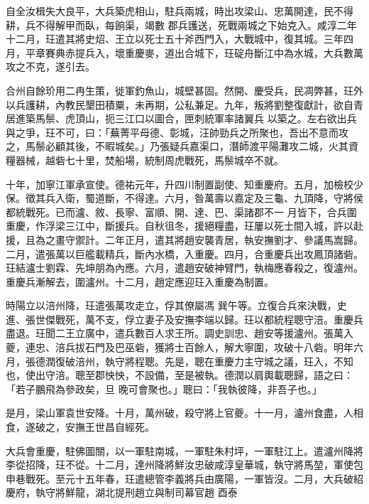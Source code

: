 \begin{pinyinscope}
 自全汝楫失大良平，大兵築虎相山，駐兵兩城，時出攻梁山、忠萬開達，民不得耕，兵不得解甲而臥，每餉渠，竭數
 郡兵護送，死戰兩城之下始克入。咸淳二年十二月，玨遣其將史炤、王立以死士五十斧西門入，大戰城中，復其城。三年四月，平章賽典赤提兵入，壞重慶麥，道出合城下，玨碇舟斷江中為水城，大兵數萬攻之不克，遂引去。



 合州自餘玠用二冉生策，徙軍釣魚山，城壁甚固。然開、慶受兵，民凋弊甚，玨外以兵護耕，內教民墾田積粟，未再期，公私兼足。九年，叛將劉整復獻計，欲自青居進築馬鬃、虎頂山，扼三江口以圖合，匣刺統軍率諸翼兵
 以築之。左右欲出兵與之爭，玨不可，曰：「蕪菁平母德、彰城，汪帥勁兵之所聚也，吾出不意而攻之，馬鬃必顧其後，不暇城矣。」乃張疑兵嘉渠口，潛師渡平陽灘攻二城，火其資糧器械，越砦七十里，焚船場，統制周虎戰死，馬鬃城卒不就。



 十年，加寧江軍承宣使。德祐元年，升四川制置副使、知重慶府。五月，加檢校少保。徵其兵入衛，蜀道斷，不得達。六月，昝萬壽以嘉定及三龜、九頂降，守將侯都統戰死。已而瀘、敘、長寧、富順、開、達、巴、渠諸郡不一
 月皆下，合兵圍重慶，作浮梁三江中，斷援兵。自秋徂冬，援絕糧盡，玨屢以死士間入城，許以赴援，且為之畫守禦計。二年正月，遣其將趙安襲青居，執安撫劉才、參議馬嵩歸。二月，遣張萬以巨艦載精兵，斷內水橋，入重慶。四月，合重慶兵出攻鳳頂諸砦。玨結瀘士劉霖、先坤朋為內應。六月，遣趙安破神臂門，執梅應春殺之，復瀘州。重慶兵漸解去，圍瀘州。十二月，趙定應迎玨入重慶為制置。



 時陽立以涪州降，玨遣張萬攻走立，俘其僚屬馮
 巽午等。立復合兵來決戰，史進、張世傑戰死，萬不支，俘立妻子及安撫李端以歸。玨以都統程聰守涪。重慶兵盡退。玨聞二王立廣中，遣兵數百人求王所。調史訓忠、趙安等援瀘州。張萬入夔，連忠、涪兵拔石門及巴巫砦，獲將士百餘人，解大寧圍，攻破十八砦。明年六月，張德潤復破涪州，執守將程聰。先是，聰在重慶力主守城之議，玨入，不知也，使出守涪。聰至郡怏怏，不設備，至是被執。德潤以肩輿載聰歸，語之曰：「若子鵬飛為參政矣，旦
 晚可會聚也。」聰曰：「我執彼降，非吾子也。」



 是月，梁山軍袁世安降。十月，萬州破，殺守將上官夔。十一月，瀘州食盡，人相食，遂破之，安撫王世昌自經死。



 大兵會重慶，駐佛圖關，以一軍駐南城，一軍駐朱村坪，一軍駐江上。遣瀘州降將李從招降，玨不從。十二月，達州降將鮮汝忠破咸淳皇華城，執守將馬堃，軍使包申巷戰死。至元十五年春，玨遣總管李義將兵由廣陽，一軍皆沒。二月，大兵破紹慶府，執守將鮮龍，湖北提刑趙立與制司幕官趙
 酉泰



\end{pinyinscope}